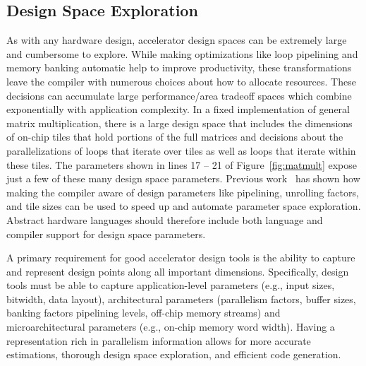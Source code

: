 \subsection{Design Space Exploration}
As with any hardware design, accelerator design spaces can be extremely large and cumbersome to explore. 
While making optimizations like loop pipelining and memory banking automatic help to improve productivity, these transformations leave the compiler with numerous choices about how to allocate resources.
These decisions can accumulate large performance/area tradeoff spaces which combine exponentially with application complexity. In a fixed implementation
of general matrix multiplication, there is a large design space that includes the dimensions of on-chip tiles that hold portions of the full matrices and decisions
about the parallelizations of loops that iterate over tiles as well as loops that iterate within these tiles.  The parameters shown in lines 17 -- 21 of Figure~\ref{fig:matmult} expose just a few of these many design space parameters.
Previous work~\cite{dhdl} has shown how making the compiler aware of design parameters like pipelining, unrolling factors, and tile sizes can be used to speed up and automate parameter space exploration. Abstract hardware languages should therefore include both language and compiler support for design space parameters.


A primary requirement for good accelerator design tools is the ability
to capture and represent design points along all important dimensions.
Specifically, design tools must be able to capture
application-level parameters (e.g., input sizes, bitwidth, data layout),
architectural parameters (parallelism factors, buffer sizes, banking factors
pipelining levels, off-chip memory streams) and microarchitectural parameters
(e.g., on-chip memory word width). Having a representation rich in parallelism
information allows for more accurate estimations, thorough design space
exploration, and efficient code generation.

